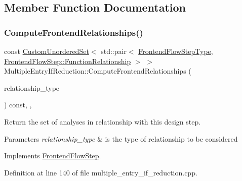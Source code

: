 \subsection{Member Function Documentation}
\mbox{\label{classMultipleEntryIfReduction_a14ca1aca808b8519a8504ac06cf11cc6}} 
\subsubsection{\texorpdfstring{Compute\+Frontend\+Relationships()}{ComputeFrontendRelationships()}}
{\footnotesize\ttfamily const \hyperlink{classCustomUnorderedSet}{Custom\+Unordered\+Set}$<$ std\+::pair$<$ \hyperlink{frontend__flow__step_8hpp_afeb3716c693d2b2e4ed3e6d04c3b63bb}{Frontend\+Flow\+Step\+Type}, \hyperlink{classFrontendFlowStep_af7cf30f2023e5b99e637dc2058289ab0}{Frontend\+Flow\+Step\+::\+Function\+Relationship} $>$ $>$ Multiple\+Entry\+If\+Reduction\+::\+Compute\+Frontend\+Relationships (\begin{DoxyParamCaption}\item[{const \hyperlink{classDesignFlowStep_a723a3baf19ff2ceb77bc13e099d0b1b7}{Design\+Flow\+Step\+::\+Relationship\+Type}}]{relationship\+\_\+type }\end{DoxyParamCaption}) const\hspace{0.3cm}{\ttfamily [override]}, {\ttfamily [private]}, {\ttfamily [virtual]}}



Return the set of analyses in relationship with this design step. 


\begin{DoxyParams}{Parameters}
{\em relationship\+\_\+type} & is the type of relationship to be considered \\
\hline
\end{DoxyParams}


Implements \hyperlink{classFrontendFlowStep_abeaff70b59734e462d347ed343dd700d}{Frontend\+Flow\+Step}.



Definition at line 140 of file multiple\+\_\+entry\+\_\+if\+\_\+reduction.\+cpp.



